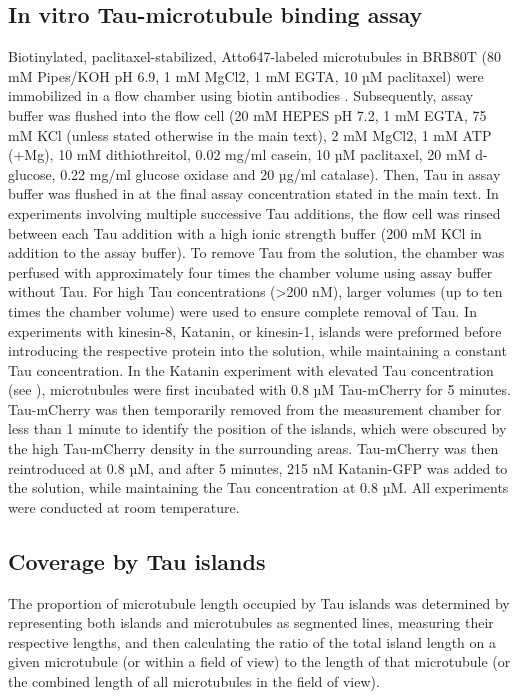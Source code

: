 \subsection{In vitro Tau-microtubule binding assay}
Biotinylated, paclitaxel-stabilized, Atto647-labeled microtubules in BRB80T (80 mM Pipes/KOH pH 6.9, 1 mM MgCl2, 1 mM EGTA, 10 µM paclitaxel) were immobilized in a flow chamber using biotin antibodies . Subsequently, assay buffer was flushed into the flow cell (20 mM HEPES pH 7.2, 1 mM EGTA, 75 mM KCl (unless stated otherwise in the main text), 2 mM MgCl2, 1 mM ATP (+Mg), 10 mM dithiothreitol, 0.02 mg/ml casein, 10 µM paclitaxel, 20 mM d-glucose, 0.22 mg/ml glucose oxidase and 20 µg/ml catalase). Then, Tau in assay buffer was flushed in at the final assay concentration stated in the main text. In experiments involving multiple successive Tau additions, the flow cell was rinsed between each Tau addition with a high ionic strength buffer (200 mM KCl in addition to the assay buffer). To remove Tau from the solution, the chamber was perfused with approximately four times the chamber volume using assay buffer without Tau. For high Tau concentrations (>200 nM), larger volumes (up to ten times the chamber volume) were used to ensure complete removal of Tau. In experiments with kinesin-8, Katanin, or kinesin-1, islands were preformed before introducing the respective protein into the solution, while maintaining a constant Tau concentration. In the Katanin experiment with elevated Tau concentration (see ), microtubules were first incubated with 0.8 µM Tau-mCherry for 5 minutes. Tau-mCherry was then temporarily removed from the measurement chamber for less than 1 minute to identify the position of the islands, which were obscured by the high Tau-mCherry density in the surrounding areas. Tau-mCherry was then reintroduced at 0.8 µM, and after 5 minutes, 215 nM Katanin-GFP was added to the solution, while maintaining the Tau concentration at 0.8 µM. All experiments were conducted at room temperature.


\subsection{Coverage by Tau islands}
The proportion of microtubule length occupied by Tau islands was determined by representing both islands and microtubules as segmented lines, measuring their respective lengths, and then calculating the ratio of the total island length on a given microtubule (or within a field of view) to the length of that microtubule (or the combined length of all microtubules in the field of view).

